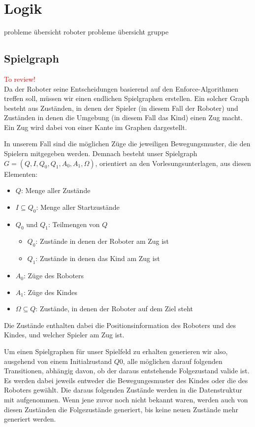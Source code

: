 \section{Logik}
probleme übersicht roboter
probleme übersicht gruppe
\subsection{Spielgraph}
\textcolor{red}{To review!}\\
Da der Roboter seine Entscheidungen basierend auf den Enforce-Algorithmen treffen soll, müssen wir einen endlichen
Spielgraphen erstellen. Ein solcher Graph besteht aus Zuständen, in denen der Spieler (in diesem Fall der Roboter)
und Zuständen in denen die Umgebung (in diesem Fall das Kind) einen Zug macht. Ein Zug wird dabei von einer Kante im Graphen
dargestellt.\par

In unserem Fall sind die möglichen Züge die jeweiligen Bewegungsmuster, die den Spielern mitgegeben werden.
Demnach besteht unser Spielgraph $G = (Q, I, Q_0, Q_1, A_0, A_1, \Omega)$, orientiert an den Vorlesungsunterlagen, aus diesen Elementen:
\begin{itemize}
	\item $Q$: Menge aller Zustände
	\item $I \subseteq Q_0$: Menge aller Startzustände
	\item $Q_0  \text{ und }  Q_1$: Teilmengen von $Q$
	\begin{itemize}
		\item $Q_0$: Zustände in denen der Roboter am Zug ist
		\item $Q_1$: Zustände in denen das Kind am Zug ist
	\end{itemize}
	\item $A_0$: Züge des Roboters
	\item $A_1$: Züge des Kindes
	\item $\Omega \subseteq Q$: Zustände, in denen der Roboter auf dem Ziel steht
\end{itemize}

Die Zustände enthalten dabei die Positionsinformation des Roboters und des Kindes, und welcher Spieler am Zug ist.

Um einen Spielgraphen für unser Spielfeld zu erhalten generieren wir also, ausgehend von einem Initialzustand $Q0$, alle möglichen darauf folgenden Transitionen, abhängig davon, ob der daraus entstehende Folgezustand valide ist. Es werden dabei jeweils entweder die Bewegungesmuster des Kindes oder die des Roboters gewählt. Die daraus folgenden Zustände werden in die Datenstruktur mit aufgenommen. Wenn jene zuvor noch nicht bekannt waren, werden auch von diesen Zuständen die Folgezustände generiert, bis keine neuen Zustände mehr generiert werden. 


